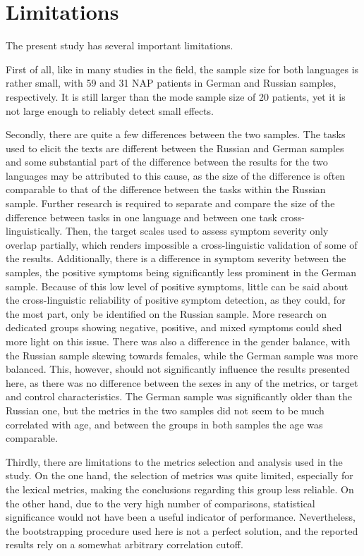 \section{Limitations}
\label{sec:discussion:limitations}

The present study has several important limitations. 

First of all, like in many studies in the field, the sample size for both languages is rather small, with 59 and 31 NAP patients in German and Russian samples, respectively. It is still larger than the mode sample size of 20 patients, yet it is not large enough to reliably detect small effects.

Secondly, there are quite a few differences between the two samples. The tasks used to elicit the texts are different between the Russian and German samples and some substantial part of the difference between the results for the two languages may be attributed to this cause, as the size of the difference is often comparable to that of the difference between the tasks within the Russian sample. Further research is required to separate and compare the size of the difference between tasks in one language and between one task cross-linguistically. Then, the target scales used to assess symptom severity only overlap partially, which renders impossible a cross-linguistic validation of some of the results. Additionally, there is a difference in symptom severity between the samples, the positive symptoms being significantly less prominent in the German sample. Because of this low level of positive symptoms, little can be said about the cross-linguistic reliability of positive symptom detection, as they could, for the most part, only be identified on the Russian sample. More research on dedicated groups showing negative, positive, and mixed symptoms could shed more light on this issue. There was also a difference in the gender balance, with the Russian sample skewing towards females, while the German sample was more balanced. This, however, should not significantly influence the results presented here, as there was no difference between the sexes in any of the metrics, or target and control characteristics. The German sample was significantly older than the Russian one, but the metrics in the two samples did not seem to be much correlated with age, and between the groups in both samples the age was comparable.

Thirdly, there are limitations to the metrics selection and analysis used in the study. On the one hand, the selection of metrics was quite limited, especially for the lexical metrics, making the conclusions regarding this group less reliable. On the other hand, due to the very high number of comparisons, statistical significance would not have been a useful indicator of performance. Nevertheless, the bootstrapping procedure used here is not a perfect solution, and the reported results rely on a somewhat arbitrary correlation cutoff.

